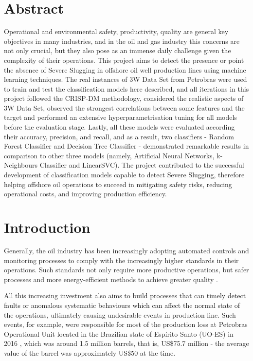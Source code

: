 \documentclass{article}
\begin{document}
\section{Abstract}
Operational and environmental safety, productivity, quality are general key objectives in many industries, and in the oil and gas industry this concerns are not only crucial, but they also pose as an immense daily challenge given the complexity of their operations. This project aims to detect the presence or point the absence of Severe Slugging in offshore oil well production lines using machine learning techniques. The real instances of 3W Data Set from Petrobras were used to train and test the classification models here described, and all iterations in this project followed the CRISP-DM methodology, considered the realistic aspects of 3W Data Set, observed the strongest correlations between some features and the target and performed an extensive hyperparametrisation tuning for all models before the evaluation stage. Lastly, all these models were evaluated according their accuracy, precision, and recall, and as a result, two classifiers - Random Forest Classifier and Decision Tree Classifier - demonstrated remarkable results in comparison to other three models (namely, Artificial Neural Networks, k-Neighbours Classifier and LinearSVC). The project contributed to the successful development of classification models capable to detect Severe Slugging, therefore helping offshore oil operations to succeed in mitigating safety risks, reducing operational costs, and improving production efficiency. 

\section{Introduction}

Generally, the oil industry has been increasingly adopting automated controls and monitoring processes \parencite{venkatasubramanian_rengaswamy_yin_kavuri_2003} to comply with the increasingly higher standards in their operations. Such standards not only require more productive operations, but safer processes and more energy-efficient methods to achieve greater quality \parencite{jounela_2007}. 

All this increasing investment also aims to build processes that can timely detect faults or anomalous systematic behaviours which can affect the normal state of the operations, ultimately causing undesirable events in production line. Such events, for example, were responsible for most of the production loss at Petrobras Operational Unit located in the Brazilian state of Espírito Santo (UO-ES) in 2016 \parencite{revvargas2019}, which was around 1.5 million barrels, that is, US\$75.7 million - the average value of the barrel was approximately US\$50 at the time.
\end{document}
